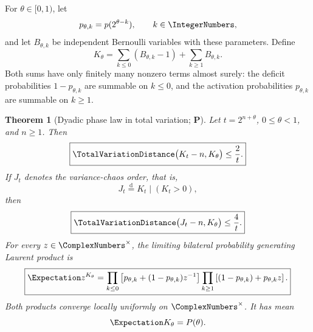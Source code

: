 \documentclass[11pt,oneside]{article}
\newtheorem{theorem}{Theorem}[section]
\theoremstyle{definition}
\theoremstyle{remark}
\newcommand{\statusP}{\textcolor{deepgreen}{\textbf{P}}}
\begin{document}
For $\theta\in[0,1)$, let
\begin{equation}
 p_{\theta,k}=p(2^{\theta-k}),\qquad k\in\IntegerNumbers,
 \label{eq:p-theta-k}
\end{equation}
and let $B_{\theta,k}$ be independent Bernoulli variables with these
parameters.  Define
\begin{equation}
 K_\theta=
 \sum_{k\le0}(B_{\theta,k}-1)+\sum_{k\ge1}B_{\theta,k}.
 \label{eq:K-theta}
\end{equation}
Both sums have only finitely many nonzero terms almost surely: the deficit
probabilities $1-p_{\theta,k}$ are summable on $k\le0$, and the activation
probabilities $p_{\theta,k}$ are summable on $k\ge1$.

\begin{theorem}[Dyadic phase law in total variation; \statusP]
\label{thm:phase-law}
Let $t=2^{n+\theta}$, $0\le\theta<1$, and $n\ge1$.  Then
\begin{equation}
 \boxed{
 \TotalVariationDistance\bigl(K_t-n,K_\theta\bigr)\le\frac2t.}
 \label{eq:phase-TV}
\end{equation}
If $J_t$ denotes the variance-chaos order, that is,
\begin{equation}
 J_t\stackrel{\mathrm d}=K_t\mid(K_t>0),
 \label{eq:J-t}
\end{equation}
then
\begin{equation}
 \boxed{
 \TotalVariationDistance\bigl(J_t-n,K_\theta\bigr)\le\frac4t.}
 \label{eq:conditioned-phase-TV}
\end{equation}
For every $z\in\ComplexNumbers^\times$, the limiting bilateral probability generating
Laurent product is
\begin{equation}
 \boxed{
 \Expectation z^{K_\theta}
 =\prod_{k\le0}\left[p_{\theta,k}+(1-p_{\theta,k})z^{-1}\right]
 \prod_{k\ge1}\left[(1-p_{\theta,k})+p_{\theta,k}z\right].}
 \label{eq:phase-pgf}
\end{equation}
Both products converge locally uniformly on $\ComplexNumbers^\times$.
It has mean
\begin{equation}
 \Expectation K_\theta=P(\theta).
 \label{eq:phase-mean}
\end{equation}
\end{theorem}
\end{document}
